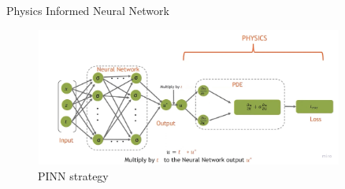 \begin{frame}{Physics Informed Neural Network}
    
    \begin{figure}
        \centering
        \includegraphics[width=0.9\textwidth]{images/loss.jpg}
        \caption{PINN strategy}
    \end{figure}

\end{frame}